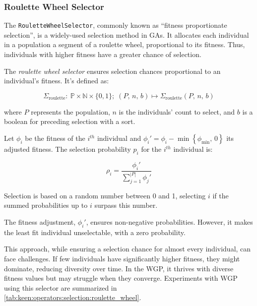 \subsubsection{Roulette Wheel Selector}
\label{sec:keen:op:select:roulette}
  The \texttt{RouletteWheelSelector}, commonly known as \enquote{fitness 
  proportionate selection}, is a widely-used selection method in GAs.
  It allocates each individual in a population a segment of a roulette wheel, 
  proportional to its fitness.
  Thus, individuals with higher fitness have a greater chance of selection.

  \begin{definition}
    The \emph{roulette wheel selector} ensures selection chances proportional to 
    an individual's fitness.
    It's defined as:

    \begin{equation}
      \Sigma_\mathrm{roulette} :\: 
        \mathbb{P} \times \mathbb{N} \times \{0, 1\};\;
      (P,\, n,\, b) \mapsto \Sigma_\mathrm{roulette}(P,\, n,\, b)
    \end{equation}

    where \(P\) represents the population, \(n\) is the individuals' count to 
    select, and \(b\) is a boolean for preceding selection with a sort.

    Let \(\phi_i\) be the fitness of the \(i^{th}\) individual and \(\phi_i' =  
    \phi_i - \min\left\{\phi_\mathrm{min},\, 0\right\}\) its adjusted fitness. 
    The selection probability \(p_i\) for the \(i^{th}\) individual is:

    \begin{equation}
      \rho_i = \frac{\phi_i'}{\sum_{j=1}^{|P|} \phi_j'}
    \end{equation}

    Selection is based on a random number between 0 and 1, selecting \(i\) if 
    the summed probabilities up to \(i\) surpass this number.
  \end{definition}

  \begin{remark}
    The fitness adjustment, \(\phi_i'\), ensures non-negative probabilities. 
    However, it makes the least fit individual unselectable, with a zero 
    probability.
  \end{remark}

  This approach, while ensuring a selection chance for almost every individual, 
  can face challenges.
  If few individuals have significantly higher fitness, they might dominate, 
  reducing diversity over time.
  In the WGP, it thrives with diverse fitness values but 
  may struggle when they converge.
  Experiments with WGP using this selector are summarized in 
  \vref{tab:keen:operators:selection:roulette_wheel}.
